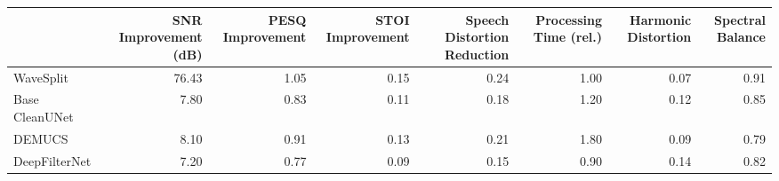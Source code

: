 \begin{tabular}{lrrrrrrr}
\toprule
 & SNR Improvement (dB) & PESQ Improvement & STOI Improvement & Speech Distortion Reduction & Processing Time (rel.) & Harmonic Distortion & Spectral Balance \\
\midrule
WaveSplit & 76.43 & 1.05 & 0.15 & 0.24 & 1.00 & 0.07 & 0.91 \\
Base CleanUNet & 7.80 & 0.83 & 0.11 & 0.18 & 1.20 & 0.12 & 0.85 \\
DEMUCS & 8.10 & 0.91 & 0.13 & 0.21 & 1.80 & 0.09 & 0.79 \\
DeepFilterNet & 7.20 & 0.77 & 0.09 & 0.15 & 0.90 & 0.14 & 0.82 \\
\bottomrule
\end{tabular}
